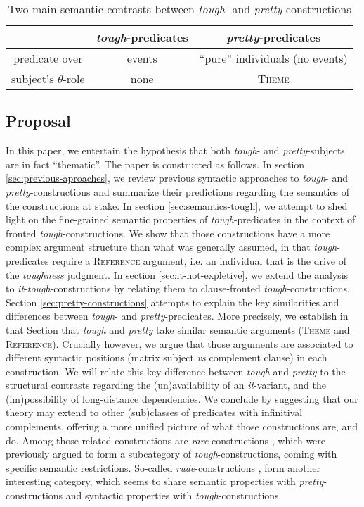 \documentclass[11pt]{article}
\begin{document}
\begin{table}[H]
	\centering
	\begin{tabular}{|c|c|c|}
		\hline
		& \textit{tough}-predicates & \textit{pretty}-predicates \\ \hline
		predicate over & events & ``pure'' individuals (no events) \\
		subject's $\theta$-role & none & \textsc{Theme} \\ \hline
	\end{tabular}
	\caption{Two main semantic contrasts between \textit{tough}- and \textit{pretty}-constructions}
\end{table}
\subsection{Proposal}
In this paper, we entertain the hypothesis that both \textit{tough}- and \textit{pretty}-subjects are in fact ``thematic''. The paper is constructed as follows. In section \ref{sec:previous-aproaches}, we review previous syntactic approaches to \textit{tough}- and \textit{pretty}-constructions and summarize their predictions regarding the semantics of the constructions at stake. In section \ref{sec:semantics-tough}, we attempt to shed light on the fine-grained semantic properties of \textit{tough}-predicates in the context of fronted \textit{tough}-constructions. We show that those constructions have a more complex argument structure than what was generally assumed, in that \textit{tough}-predicates require a \textsc{Reference} argument, i.e. an individual that is the drive of the \textit{toughness} judgment. In section \ref{sec:it-not-expletive}, we extend the analysis to \textit{it}-\textit{tough}-constructions by relating them to clause-fronted \textit{tough}-constructions. Section \ref{sec:pretty-constructions} attempts to explain the key similarities and differences between \textit{tough}- and \textit{pretty}-predicates. More precisely, we establish in that Section that \textit{tough} and \textit{pretty} take similar semantic arguments (\textsc{Theme} and \textsc{Reference}). Crucially however, we argue that those arguments are associated to different syntactic positions (matrix subject \textit{vs} complement clause) in each construction. We will relate this key difference between \textit{tough} and \textit{pretty} to the structural contrasts regarding the (un)availability of an \textit{it}-variant, and the (im)possibility of long-distance dependencies. We conclude by suggesting that our theory may extend to other (sub)classes of predicates with infinitival complements, offering a more unified picture of what those constructions are, and do. Among those related constructions are \textit{rare}-constructions \cite{Fleisher2015}, which were previously argued to form a subcategory of \textit{tough}-constructions, coming with specific semantic restrictions. So-called \textit{rude}-constructions \cite{Stowell1991}, form another interesting category, which seems to share semantic properties with \textit{pretty}-constructions and syntactic properties with \textit{tough}-constructions.
\end{document}
